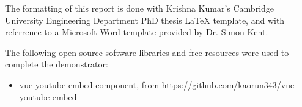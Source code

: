 
\begin{acknowledgements}      

The formatting of this report is done with Krishna Kumar's Cambridge University Engineering Department PhD thesis 
LaTeX template, and with referrence to a Microsoft Word template provided by Dr. Simon Kent.

The following open source software libraries and free resources were used to complete the demonstrator:
\begin{itemize}
    \item vue-youtube-embed component, from https://github.com/kaorun343/vue-youtube-embed
\end{itemize}


\end{acknowledgements}
